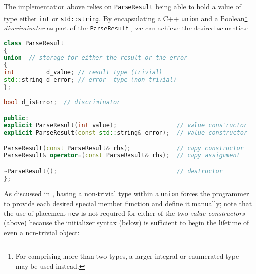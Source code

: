 \noindent The implementation above relies on \lstinline!ParseResult! being able to
hold a value of type either \lstinline!int! or \lstinline!std::string!. By
encapsulating a C++ \lstinline!union! and a Boolean{\cprotect\footnote{For
 comprising more than two types, a larger integral
or enumerated type may be used instead.}} \emph{discriminator} as part
of the \lstinline!ParseResult! , we can achieve the
desired semantics:

%
%
%
%
\begin{lstlisting}[language=C++]
class ParseResult
{
union  // storage for either the result or the error
{
int         d_value; // result type (trivial)
std::string d_error; // error  type (non-trivial)
};

bool d_isError;  // discriminator

public:
explicit ParseResult(int value);                 // value constructor (1)
explicit ParseResult(const std::string& error);  // value constructor (2)

ParseResult(const ParseResult& rhs);             // copy constructor
ParseResult& operator=(const ParseResult& rhs);  // copy assignment

~ParseResult();                                  // destructor
};
\end{lstlisting}


\noindent As discussed in
, having a non-trivial
type within a \lstinline!union! forces the programmer to provide each
desired special member function and define it manually; note
that the use of placement \lstinline!new! is not required for either of the
two \emph{value constructors} (above) because the initializer syntax
(below) is sufficient to begin the lifetime of even a non-trivial
object:

